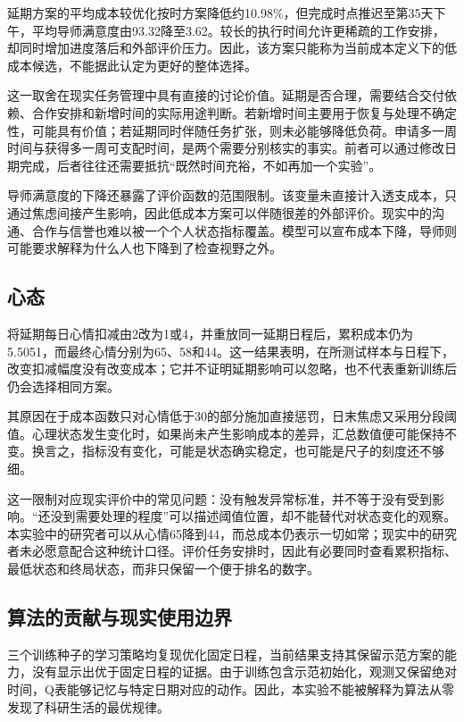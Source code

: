 \documentclass[journal]{IEEEtran}
\begin{document}
延期方案的平均成本较优化按时方案降低约10.98\%，但完成时点推迟至第35天下午，平均导师满意度由93.32降至3.62。较长的执行时间允许更稀疏的工作安排，却同时增加进度落后和外部评价压力。因此，该方案只能称为当前成本定义下的低成本候选，不能据此认定为更好的整体选择。

这一取舍在现实任务管理中具有直接的讨论价值。延期是否合理，需要结合交付依赖、合作安排和新增时间的实际用途判断。若新增时间主要用于恢复与处理不确定性，可能具有价值；若延期同时伴随任务扩张，则未必能够降低负荷。申请多一周时间与获得多一周可支配时间，是两个需要分别核实的事实。前者可以通过修改日期完成，后者往往还需要抵抗“既然时间充裕，不如再加一个实验”。

导师满意度的下降还暴露了评价函数的范围限制。该变量未直接计入透支成本，只通过焦虑间接产生影响，因此低成本方案可以伴随很差的外部评价。现实中的沟通、合作与信誉也难以被一个个人状态指标覆盖。模型可以宣布成本下降，导师则可能要求解释为什么人也下降到了检查视野之外。

\subsection{心态}

将延期每日心情扣减由2改为1或4，并重放同一延期日程后，累积成本仍为5.5051，而最终心情分别为65、58和44。这一结果表明，在所测试样本与日程下，改变扣减幅度没有改变成本；它并不证明延期影响可以忽略，也不代表重新训练后仍会选择相同方案。

其原因在于成本函数只对心情低于30的部分施加直接惩罚，日末焦虑又采用分段阈值。心理状态发生变化时，如果尚未产生影响成本的差异，汇总数值便可能保持不变。换言之，指标没有变化，可能是状态确实稳定，也可能是尺子的刻度还不够细。

这一限制对应现实评价中的常见问题：没有触发异常标准，并不等于没有受到影响。“还没到需要处理的程度”可以描述阈值位置，却不能替代对状态变化的观察。本实验中的研究者可以从心情65降到44，而总成本仍表示一切如常；现实中的研究者未必愿意配合这种统计口径。评价任务安排时，因此有必要同时查看累积指标、最低状态和终局状态，而非只保留一个便于排名的数字。

\subsection{算法的贡献与现实使用边界}

三个训练种子的学习策略均复现优化固定日程，当前结果支持其保留示范方案的能力，没有显示出优于固定日程的证据。由于训练包含示范初始化，观测又保留绝对时间，Q表能够记忆与特定日期对应的动作。因此，本实验不能被解释为算法从零发现了科研生活的最优规律。
\end{document}
